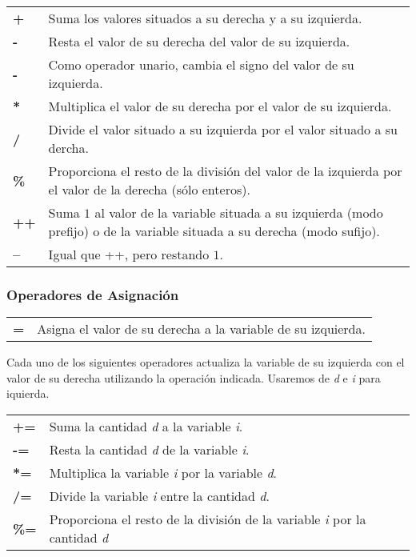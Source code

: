 \begin{tabular}{p{0.5cm}p{14cm}}
\textbf{+} & Suma los valores situados a su derecha y a su izquierda.\\
\textbf{-} & Resta el valor de su derecha del valor de su izquierda.\\
\textbf{-} & Como operador unario, cambia el signo del valor  de su izquierda.\\
\textbf{*} & Multiplica el valor de su derecha por el valor de su izquierda.\\
\textbf{/} & Divide el valor situado a su izquierda por el valor situado a su dercha.\\
\textbf{\%} & Proporciona el resto de la división del valor de la izquierda por el valor de la derecha (sólo enteros).\\
\textbf{++} & Suma $1$ al valor de la variable situada a su izquierda (modo prefijo) o de la variable situada a su derecha (modo sufijo).\\
\textbf{--} & Igual que ++, pero restando $1$.\\
\end{tabular}

\subsubsection{Operadores de Asignación}

\begin{tabular}{p{0.5cm}p{14cm}}
\textbf{=} & Asigna el valor de su derecha a la variable de su izquierda.\\
\end{tabular}

Cada uno de los siguientes operadores actualiza la variable de su izquierda con el valor de su derecha utilizando la operación indicada. Usaremos de \textit{d} e \textit{i} para iquierda.

\begin{tabular}{p{0.5cm}p{14cm}}
\textbf{+=} & Suma la cantidad \textit{d} a la variable \textit{i}.\\
\textbf{-=} & Resta la cantidad \textit{d} de la variable \textit{i}.\\
\textbf{*=} & Multiplica la variable \textit{i} por la variable \textit{d}.\\
\textbf{/=} & Divide la variable \textit{i} entre la cantidad \textit{d}.\\
\textbf{\%=} & Proporciona el resto de la división de la variable \textit{i}  por la cantidad \textit{d}\\
\end{tabular}

